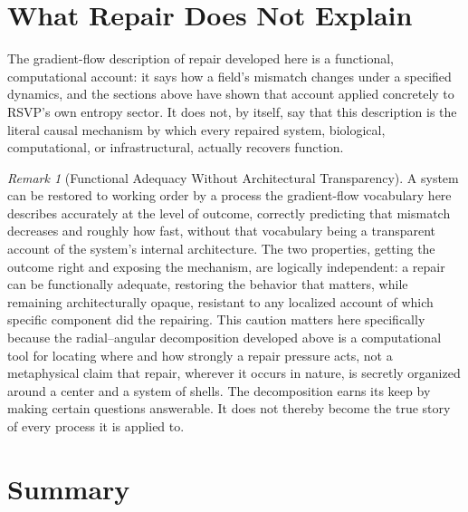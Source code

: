 \documentclass[11pt,fleqn]{book}
\numberwithin{equation}{chapter}
\theoremstyle{plain}
\theoremstyle{definition}
\theoremstyle{remark}
\newtheorem{remark}[theorem]{Remark}
\begin{document}
\section{What Repair Does Not Explain}

The gradient-flow description of repair developed here is a functional, computational account: it says how a field's mismatch changes under a specified dynamics, and the sections above have shown that account applied concretely to RSVP's own entropy sector. It does not, by itself, say that this description is the literal causal mechanism by which every repaired system, biological, computational, or infrastructural, actually recovers function.

\begin{remark}[Functional Adequacy Without Architectural Transparency]
A system can be restored to working order by a process the gradient-flow vocabulary here describes accurately at the level of outcome, correctly predicting that mismatch decreases and roughly how fast, without that vocabulary being a transparent account of the system's internal architecture. The two properties, getting the outcome right and exposing the mechanism, are logically independent: a repair can be functionally adequate, restoring the behavior that matters, while remaining architecturally opaque, resistant to any localized account of which specific component did the repairing. This caution matters here specifically because the radial--angular decomposition developed above is a computational tool for locating where and how strongly a repair pressure acts, not a metaphysical claim that repair, wherever it occurs in nature, is secretly organized around a center and a system of shells. The decomposition earns its keep by making certain questions answerable. It does not thereby become the true story of every process it is applied to.
\end{remark}

\section{Summary}
\end{document}
